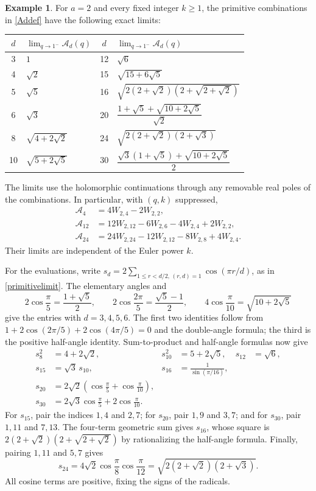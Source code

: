 \documentclass[11pt]{amsart}
\theoremstyle{definition}
\newtheorem{example}[theorem]{Example}
\theoremstyle{remark}
\numberwithin{equation}{section}
\begin{document}
\begin{example}\label{primitiveexamples}
For $a=2$ and every fixed integer $k\ge1$, the primitive combinations
in \eqref{Addef} have the following exact limits:
\begin{center}
\begin{tabular}{@{}cl@{\qquad}cl@{}}
\toprule
$d$ & $\displaystyle\lim_{q\to1^-}\mathcal A_d(q)$
& $d$ & $\displaystyle\lim_{q\to1^-}\mathcal A_d(q)$\\
\midrule
3 & $1$ & 12 & $\sqrt6$\\
4 & $\sqrt2$ & 15 & $\sqrt{15+6\sqrt5}$\\
5 & $\sqrt5$ & 16 & $\sqrt{2(2+\sqrt2)(2+\sqrt{2+\sqrt2})}$\\
6 & $\sqrt3$ & 20 & $\dfrac{1+\sqrt5+\sqrt{10+2\sqrt5}}{\sqrt2}$\\[6pt]
8 & $\sqrt{4+2\sqrt2}$ & 24 & $\sqrt{2(2+\sqrt2)(2+\sqrt3)}$\\
10 & $\sqrt{5+2\sqrt5}$ & 30 & $\dfrac{\sqrt3(1+\sqrt5)+\sqrt{10+2\sqrt5}}2$\\[6pt]
\bottomrule
\end{tabular}
\end{center}
The limits use the holomorphic continuations through any removable real
poles of the combinations. In particular, with $(q,k)$ suppressed,
\begin{align*}
 \mathcal A_4&=4W_{2,4}-2W_{2,2},\\
 \mathcal A_{12}&=12W_{2,12}-6W_{2,6}-4W_{2,4}+2W_{2,2},\\
 \mathcal A_{24}&=24W_{2,24}-12W_{2,12}-8W_{2,8}+4W_{2,4}.
\end{align*}
Their limits are independent of the Euler power $k$.

For the evaluations, write
$s_d=2\sum_{1\le r<d/2,\,(r,d)=1}\cos(\pi r/d)$, as in
\eqref{primitivelimit}. The elementary angles and
\[
 2\cos\frac\pi5=\frac{1+\sqrt5}{2},\qquad
 2\cos\frac{2\pi}5=\frac{\sqrt5-1}{2},\qquad
 4\cos\frac\pi{10}=\sqrt{10+2\sqrt5}
\]
give the entries with $d=3,4,5,6$.
The first two identities follow from
$1+2\cos(2\pi/5)+2\cos(4\pi/5)=0$ and the double-angle formula;
the third is the positive half-angle identity.
Sum-to-product and half-angle formulas now give
\begin{align*}
 s_8^2&=4+2\sqrt2,&
 s_{10}^2&=5+2\sqrt5,&
 s_{12}&=\sqrt6,\\
 s_{15}&=\sqrt3\,s_{10},&
 s_{16}&=\frac1{\sin(\pi/16)},\\
 s_{20}&=2\sqrt2\left(\cos\frac\pi5+\cos\frac\pi{10}\right),&&\\
 s_{30}&=2\sqrt3\cos\frac\pi5+2\cos\frac\pi{10}.&&
\end{align*}
For $s_{15}$, pair the indices $1,4$ and $2,7$; for $s_{20}$,
pair $1,9$ and $3,7$; and for $s_{30}$, pair $1,11$ and $7,13$.
The four-term geometric sum gives $s_{16}$, whose square is
$2(2+\sqrt2)(2+\sqrt{2+\sqrt2})$ by rationalizing the half-angle
formula. Finally, pairing $1,11$ and $5,7$ gives
\[
 s_{24}=4\sqrt2\cos\frac\pi8\cos\frac\pi{12}
       =\sqrt{2(2+\sqrt2)(2+\sqrt3)}.
\]
All cosine terms are positive, fixing the signs of the radicals.


\end{example}
\end{document}
